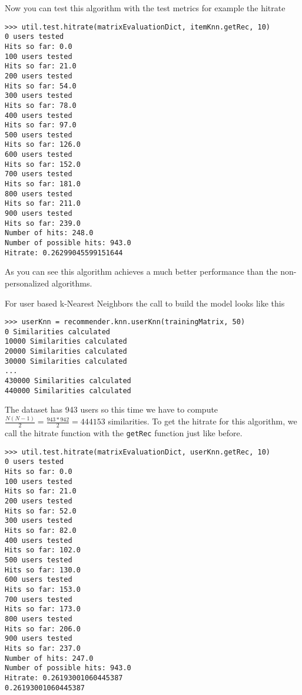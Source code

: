 Now you can test this algorithm with the test metrics for example the hitrate
\begin{lstlisting}[style=python]
>>> util.test.hitrate(matrixEvaluationDict, itemKnn.getRec, 10)
0 users tested
Hits so far: 0.0
100 users tested
Hits so far: 21.0
200 users tested
Hits so far: 54.0
300 users tested
Hits so far: 78.0
400 users tested
Hits so far: 97.0
500 users tested
Hits so far: 126.0
600 users tested
Hits so far: 152.0
700 users tested
Hits so far: 181.0
800 users tested
Hits so far: 211.0
900 users tested
Hits so far: 239.0
Number of hits: 248.0
Number of possible hits: 943.0
Hitrate: 0.26299045599151644
\end{lstlisting}
As you can see this algorithm achieves a much better performance than the
non-personalized algorithms.

For user based k-Nearest Neighbors the call to build the model looks like this
\begin{lstlisting}[style=python]
>>> userKnn = recommender.knn.userKnn(trainingMatrix, 50)
0 Similarities calculated
10000 Similarities calculated
20000 Similarities calculated
30000 Similarities calculated
...
430000 Similarities calculated
440000 Similarities calculated
\end{lstlisting}
The dataset has 943 users so this time we have to compute 
\begin{math} \frac{N(N-1)}{2}=\frac{943*942}{2} = 444153 \end{math} similarities.
To get the hitrate for this algorithm, we call the hitrate
function with the \lstinline!getRec! function just like before.
\begin{lstlisting}[style=python]
>>> util.test.hitrate(matrixEvaluationDict, userKnn.getRec, 10)
0 users tested
Hits so far: 0.0
100 users tested
Hits so far: 21.0
200 users tested
Hits so far: 52.0
300 users tested
Hits so far: 82.0
400 users tested
Hits so far: 102.0
500 users tested
Hits so far: 130.0
600 users tested
Hits so far: 153.0
700 users tested
Hits so far: 173.0
800 users tested
Hits so far: 206.0
900 users tested
Hits so far: 237.0
Number of hits: 247.0
Number of possible hits: 943.0
Hitrate: 0.26193001060445387
0.26193001060445387
\end{lstlisting}

